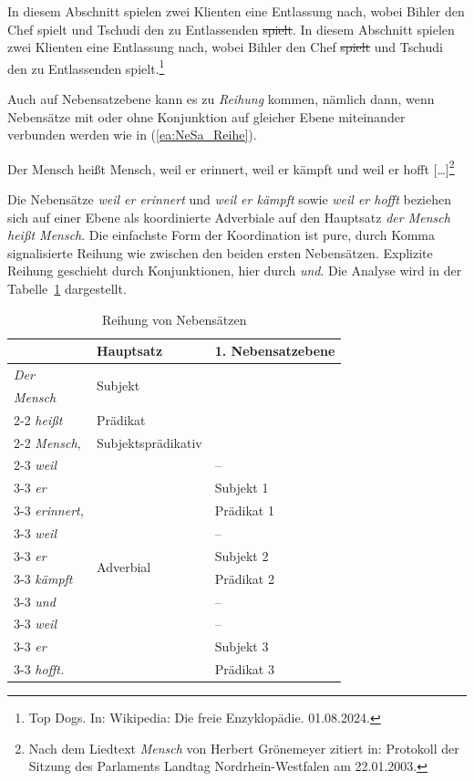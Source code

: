 \ea 
\ea \label{ea:KoordinationsellipseNeSa1} In diesem Abschnitt spielen zwei Klienten eine Entlassung nach, wobei Bihler den Chef spielt und Tschudi den zu Entlassenden \sout{spielt}.
\ex \label{ea:KoordinationsellipseNeSa2} In diesem Abschnitt spielen zwei Klienten eine Entlassung nach, wobei Bihler den Chef \sout{spielt} und Tschudi den zu Entlassenden spielt.\footnote{Top Dogs. In: Wikipedia: Die freie Enzyklopädie. 01.08.2024.}
\z 
\z 

Auch auf Nebensatzebene kann es zu \textit{Reihung} kommen, nämlich dann, wenn Nebensätze mit oder ohne Konjunktion auf gleicher Ebene miteinander verbunden werden wie in (\ref{ea:NeSa_Reihe}). 

\ea \label{ea:NeSa_Reihe} Der Mensch heißt Mensch, weil er erinnert, weil er kämpft und weil er hofft [\ldots{}]\footnote{Nach dem Liedtext \textit{Mensch} von Herbert Grönemeyer zitiert in: Protokoll der Sitzung des Parlaments Landtag Nordrhein-Westfalen am 22.01.2003.}
\z 

Die Nebensätze \textit{weil er erinnert} und \textit{weil er kämpft} sowie \textit{weil er hofft} beziehen sich auf einer Ebene als koordinierte Adverbiale auf den Hauptsatz \textit{der Mensch heißt Mensch}. Die einfachste Form der Koordination ist pure, durch Komma signalisierte Reihung wie zwischen den beiden ersten Nebensätzen. Explizite Reihung geschieht durch Konjunktionen, hier durch \textit{und}. Die Analyse wird in der Tabelle~\ref{tab:Satzgefüge3} dargestellt.

\begin{table}
  \centering
  \begin{tabular}{l|l|l}
      & Hauptsatz & 1. Nebensatzebene \\
    \hline
    \textit{Der} & \multirow{2}{*}{Subjekt} &  \\
    \textit{Mensch} & & \\ \cline{2-2}
    \textit{heißt} & Prädikat & \\ \cline{2-2} 
    \textit{Mensch,} & Subjektsprädikativ & \\ \cline{2-3}
    \textit{weil} & \multirow{10}{*}{Adverbial} & -- \\ \cline{3-3} 
    \textit{er} & & Subjekt 1 \\ \cline{3-3}
    \textit{erinnert,} & & Prädikat 1 \\ \cline{3-3} 
    \textit{weil} &  & -- \\ \cline{3-3}
    \textit{er} & & Subjekt 2\\ \cline{3-3}
    \textit{kämpft} & & Prädikat 2  \\ \cline{3-3}
    \textit{und} &  & -- \\ \cline{3-3} 
    \textit{weil} & & -- \\ \cline{3-3} 
    \textit{er} & & Subjekt 3 \\ \cline{3-3} 
    \textit{hofft.} &  & Prädikat 3 \\ 
    \hline 
  \end{tabular}
  \caption{Reihung von Nebensätzen}
  \label{tab:Satzgefüge3}
\end{table}

